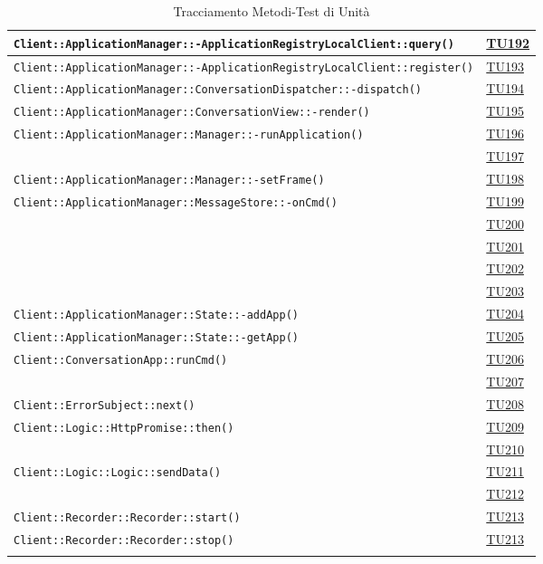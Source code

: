 \begin{longtable}{|>{\centering}m{12cm}|m{1cm}<{\centering}|}
\texttt{Client::ApplicationManager::-\linebreak ApplicationRegistryLocalClient::query()} & \hyperlink{TU192}{TU192}\\ \hline
\texttt{Client::ApplicationManager::-\linebreak ApplicationRegistryLocalClient::register()} & \hyperlink{TU193}{TU193}\\ \hline
\texttt{Client::ApplicationManager::ConversationDispatcher::-\linebreak dispatch()} & \hyperlink{TU194}{TU194}\\ \hline
\texttt{Client::ApplicationManager::ConversationView::-\linebreak render()} & \hyperlink{TU195}{TU195}\\ \hline
\texttt{Client::ApplicationManager::Manager::-\linebreak runApplication()} & \hyperlink{TU196}{TU196}\\ & \hyperlink{TU197}{TU197}\\ \hline
\texttt{Client::ApplicationManager::Manager::-\linebreak setFrame()} & \hyperlink{TU198}{TU198}\\ \hline
\texttt{Client::ApplicationManager::MessageStore::-\linebreak onCmd()} & \hyperlink{TU199}{TU199}\\ & \hyperlink{TU200}{TU200}\\ & \hyperlink{TU201}{TU201}\\ & \hyperlink{TU202}{TU202}\\ & \hyperlink{TU203}{TU203}\\ \hline
\texttt{Client::ApplicationManager::State::-\linebreak addApp()} & \hyperlink{TU204}{TU204}\\ \hline
\texttt{Client::ApplicationManager::State::-\linebreak getApp()} & \hyperlink{TU205}{TU205}\\ \hline
\texttt{Client::ConversationApp::runCmd()} & \hyperlink{TU206}{TU206}\\ & \hyperlink{TU207}{TU207}\\ \hline
\texttt{Client::ErrorSubject::next()} & \hyperlink{TU208}{TU208}\\ \hline
\texttt{Client::Logic::HttpPromise::then()} & \hyperlink{TU209}{TU209}\\ & \hyperlink{TU210}{TU210}\\ \hline
\texttt{Client::Logic::Logic::sendData()} & \hyperlink{TU211}{TU211}\\ & \hyperlink{TU212}{TU212}\\ \hline
\texttt{Client::Recorder::Recorder::start()} & \hyperlink{TU213}{TU213}\\ \hline
\texttt{Client::Recorder::Recorder::stop()} & \hyperlink{TU213}{TU213}\\ \hline

\caption[Tracciamento Metodi-Test di Unità]{Tracciamento Metodi-Test di Unità}
\label{tabella:met-tu}
\end{longtable}
\clearpage
